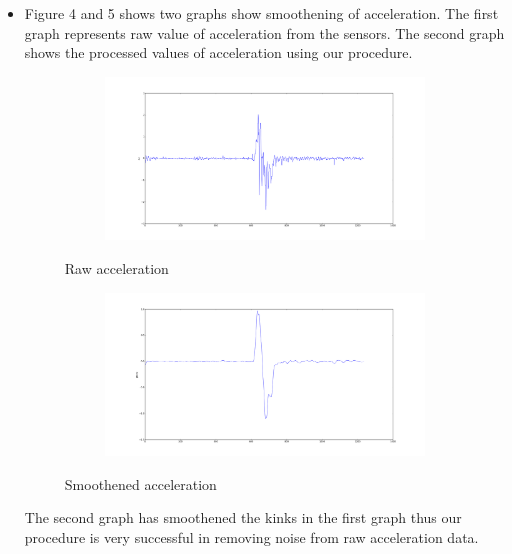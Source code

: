 \documentclass{article}
\begin{document}
			\begin{itemize}
			\item Figure 4 and 5 shows two graphs show smoothening of acceleration. The first graph represents raw value of acceleration from the sensors. The second graph shows the processed values of acceleration using our procedure.
    		\begin{figure}[H]
					\centering
					\begin{subfigure}{\textwidth}
					  	\centering
					  	\includegraphics[width=1.0\linewidth]{rawacc.png}
					  	\label{fig:sub1}
					\end{subfigure}%
					\caption{Raw acceleration}
			\end{figure}

			\begin{figure}[H]
					\begin{subfigure}{\textwidth}
					  	\centering
					  	\includegraphics[width=1.0\linewidth]{procacc.png}
					  	\label{fig:sub2}
					\end{subfigure}
					\caption{Smoothened acceleration}
					\label{figstart}
			\end{figure}
			The second graph has smoothened the kinks in the first graph thus our procedure is very successful in removing noise from raw acceleration data.


\end{itemize}
\end{document}
